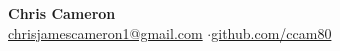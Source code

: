 \documentclass[10pt,a4paper]{article}
\begin{document}
\begin{center}
  {\Huge\bfseries Chris Cameron}\\[1.4ex]
  \href{mailto:chrisjamescameron1@gmail.com}{chrisjamescameron1@gmail.com}
  \enspace$\cdot$\enspace \href{https://github.com/ccam80}{github.com/ccam80}
\end{center}


\newlength{\colheadshift}
\setlength{\colheadshift}{10pt}
\vspace{\colheadshift}
\end{document}
